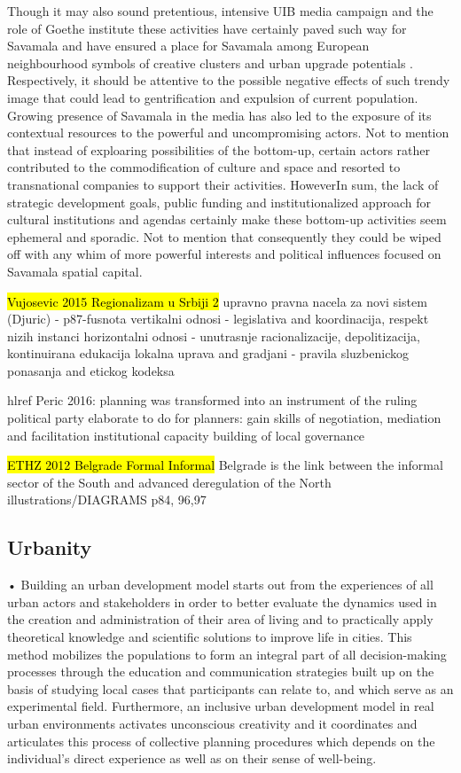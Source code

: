 \documentclass[11pt]{report}
\begin{document}
Though it may also sound pretentious, intensive UIB media campaign  and the role of Goethe institute these activities have certainly paved such way for Savamala and have ensured a place for Savamala among European neighbourhood symbols of creative clusters and urban upgrade potentials  .  Respectively, it should be attentive to the possible negative effects of such trendy image that could lead to gentrification and expulsion of current population. Growing presence of Savamala in the media has also led to the exposure of its contextual resources to the powerful and uncompromising actors. Not to mention that instead of exploaring possibilities of the bottom-up, certain actors rather contributed to the commodification of culture and space and resorted to transnational companies   to support their activities.  HoweverIn sum, the lack of strategic development goals, public funding and institutionalized approach for cultural institutions and agendas certainly make these bottom-up activities seem ephemeral and sporadic. Not to mention that consequently they could be wiped off with any whim of more powerful interests and political influences focused on Savamala spatial capital.

\hl{Vujosevic 2015 Regionalizam u Srbiji 2}
upravno pravna nacela za novi sistem (Djuric) - p87-fusnota
    vertikalni odnosi - legislativa and koordinacija, respekt nizih instanci
    horizontalni odnosi - unutrasnje racionalizacije, depolitizacija, kontinuirana edukacija
    lokalna uprava and gradjani - pravila sluzbenickog ponasanja and etickog kodeksa
    
hl{ref Peric 2016}: planning was transformed into an instrument of the ruling political party elaborate
to do for planners:
     gain skills of negotiation, mediation and facilitation
    institutional capacity building of local governance
    
\hl{ETHZ 2012 Belgrade Formal Informal}
Belgrade is the link between the informal sector of the South and advanced deregulation of the North
illustrations/DIAGRAMS p84, 96,97
    
\subsection{Urbanity}

•	Building an urban development model starts out from the experiences of all urban actors and stakeholders in order to better evaluate the dynamics used in the creation and administration of their area of living and to practically apply theoretical knowledge and scientific solutions to improve life in cities. This method mobilizes the populations to form an integral part of all decision-making processes through the education and communication strategies built up on the basis of studying local cases that participants can relate to, and which serve as an experimental field. Furthermore, an inclusive urban development model in real urban environments activates unconscious creativity and it coordinates and articulates this process of collective planning procedures which depends on the individual's direct experience as well as on their sense of well-being.
\end{document}
